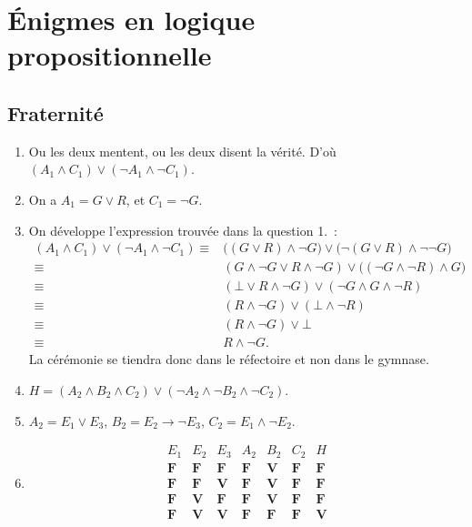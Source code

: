 \section{Énigmes en logique propositionnelle}
\subsection{Fraternité}

\begin{enumerate}
	\item Ou les deux mentent, ou les deux disent la vérité. D'où $(A_1 \land C_1) \lor (\lnot A_1 \land \lnot C_1)$.
	\item On a $A_1 = G \lor R$, et $C_1 = \lnot G$.
	\item On développe l'expression trouvée dans la question 1.\ :
		\begin{align*}
			(A_1 \land C_1) \lor (\lnot A_1 \land \lnot C_1) \equiv& \big((G \lor R) \land \lnot G\big) \lor \big(\lnot (G \lor R) \land \lnot \lnot G\big)\\
			\equiv& (G \land \lnot G \lor R \land \lnot G) \lor \big((\lnot G \land \lnot R) \land G\big)\\
			\equiv& (\bot \lor R \land \lnot G) \lor (\lnot G \land G \land \lnot R)\\
			\equiv& (R \land \lnot G) \lor (\bot \land \lnot R)\\
			\equiv& (R \land \lnot G) \lor \bot\\
			\equiv& R \land \lnot G.
		\end{align*}
		La cérémonie se tiendra donc dans le réfectoire et non dans le gymnase.
	\item $H = (A_2 \land B_2 \land C_2) \lor (\lnot A_2 \land \lnot B_2 \land \lnot C_2)$.
	\item $A_2 = E_1 \lor E_3$, $B_2 = E_2 \to \lnot E_3$, $C_2 = E_1 \land \lnot E_2$.
	\item \[
			\begin{array}{ccc|ccc|c}
				E_1&E_2&E_3&A_2&B_2&C_2&H \\ \hline
				\mathbf{F} & \mathbf{F} & \mathbf{F} & \mathbf{F} & \mathbf{V} & \mathbf{F} & \mathbf{F}\\
				\mathbf{F} & \mathbf{F} & \mathbf{V} & \mathbf{F} & \mathbf{V} & \mathbf{F} & \mathbf{F}\\
				\mathbf{F} & \mathbf{V} & \mathbf{F} & \mathbf{F} & \mathbf{V} & \mathbf{F} & \mathbf{F}\\
				\mathbf{F} & \mathbf{V} & \mathbf{V} & \mathbf{F} & \mathbf{F} & \mathbf{F} & \mathbf{V}\\

\end{array}\]
\end{enumerate}
